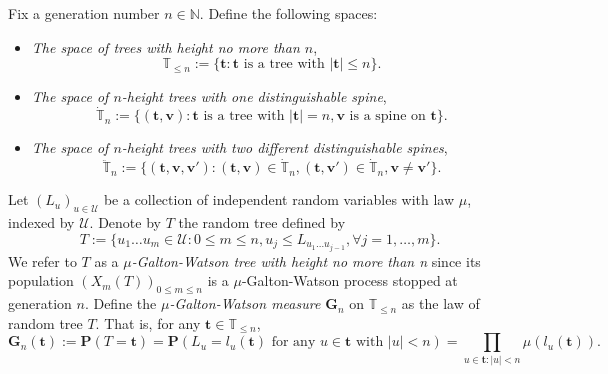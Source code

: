 \documentclass[12pt,a4paper]{amsart}
\numberwithin{equation}{section}
\begin{document}
	Fix a generation number $n\in \mathbb N$. Define the following spaces:
\begin{itemize}
\item
	\emph{The space of trees with height no more than $n$},
\begin{equation*}
		\mathbb T_{\leq n}
	:=
		\{ \mathbf t : \mathbf t \text{ is a tree with }| \mathbf t | \leq n\}.
\end{equation*}
\item
	\emph {The space of $n$-height trees with one distinguishable spine},
\begin{equation*}
		\dot{\mathbb T}_n
	:=
		\{( \mathbf t , \mathbf v): \mathbf t  \text{ is a tree with } | \mathbf t |=n,  \mathbf v \text{ is a spine on }  \mathbf t \}.
\end{equation*}
\item 
	\emph{The space of $n$-height trees with two different distinguishable spines},
\begin{equation*}
		\ddot{\mathbb T}_n
	:=
		\{( \mathbf t , \mathbf v, \mathbf v'):( \mathbf t , \mathbf v)\in\dot{\mathbb T}_n,( \mathbf t , \mathbf v')\in\dot{\mathbb T}_n, \mathbf v\neq \mathbf v'\}.
\end{equation*}
\end{itemize}

	Let $(L_u)_{u\in\mathcal U}$ be a collection of independent random variables with law $\mu$, indexed by $\mathcal U$. 
	Denote by $T$ the random tree defined by
\begin{equation*}
		T
	:=
		\{u_1\dots u_m\in \mathcal U: 0\le m\le n, u_j\leq L_{u_1\dots u_{j-1}},\forall j=1,\dots,m\}.
\end{equation*}
	We refer to $T$ as a \emph{$\mu$-Galton-Watson tree with height no more than n} since its population $(X_m(T))_{0\le m\le n}$ is a $\mu$-Galton-Watson process stopped at generation $n$.
	Define the \emph{$\mu$-Galton-Watson measure $\mathbf G_n$} on $\mathbb T_{\leq n}$ as the law of random tree $T$. That is, for any $ \mathbf t \in\mathbb T_{\leq n}$,
\begin{equation*}
		\mathbf G_n( \mathbf t )
    :=
		\mathbf P(T= \mathbf t )
	=
        \mathbf P(L_u=l_u( \mathbf t )\text{ for any } u\in \mathbf t  \text{ with }|u|<n)
	=
		\prod_{u\in  \mathbf t :|u|<n}\mu(l_u( \mathbf t )).
\end{equation*}
\end{document}
